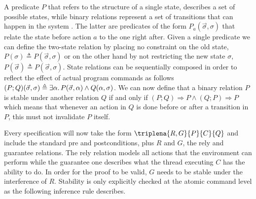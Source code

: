 \begin{center}
\end{center}

A predicate $P$ that refers to the structure of a single state, describes a set of possible states, while binary relations represent a set of transitions that can happen in the system \cite{viktor}. The latter are predicates of the form $P_a(\vec{\sigma}, \sigma)$ that relate the state before action $a$ to the one right after. Given a single predicate we can define the two-state relation by placing no constraint on the old state, $P(\sigma) \triangleq P(\vec{\sigma}, \sigma)$ or on the other hand by not restricting the new state $\sigma$, $P(\vec{\sigma}) \triangleq P(\vec{\sigma}, \sigma)$. State relations can be sequentially composed in order to reflect the effect of actual program commands as follows $(P; Q)(\vec{\sigma}, \sigma) \triangleq \exists \alpha \ldotp P(\vec{\sigma}, \alpha) \land Q(\alpha, \sigma)$. We can now define that a binary relation $P$ is stable under another relation $Q$ if and only if $(P; Q) \Rightarrow P \land (Q; P) \Rightarrow P$ which means that whenever an action in $Q$ is done before or after a transition in $P$, this must not invalidate $P$ itself.

Every specification will now take the form $\triplena{R, G}{P}{C}{Q}$ and include the standard pre and postconditions, plus $R$ and $G$, the rely and guarantee relations. The rely relation models all actions that the environment can perform while the guarantee one describes what the thread executing $C$ has the ability to do. In order for the proof to be valid, $G$ needs to be stable under the interference of $R$. Stability is only explicitly checked at the atomic command level \cite{viktor} as the following inference rule describes.

